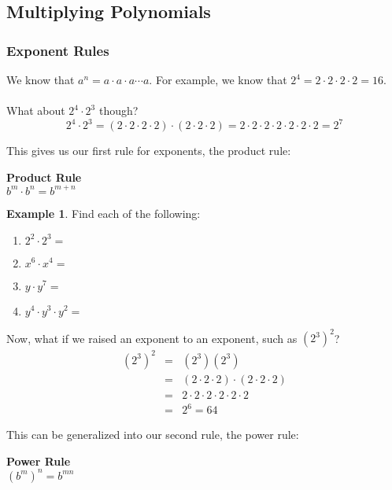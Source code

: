 \documentclass[addpoints,12pt]{exam}
\theoremstyle{definition}
\theoremstyle{break}
\theoremstyle{break}
\newtheorem{example}{Example}[subsection]
\begin{document}
\setcounter{section}{5}
\setcounter{subsection}{1}

\subsection{Multiplying Polynomials}

\vspace{.15in}

\subsubsection*{Exponent Rules}
\noindent We know that $a^n = a\cdot a \cdot a \cdots a$. For example, we know that $2^4 = 2\cdot 2\cdot 2\cdot 2 = 16$.
\\\\
What about $2^4\cdot 2^3$ though?
\[2^4\cdot 2^3 = (2\cdot 2\cdot 2\cdot 2)\cdot(2\cdot 2\cdot 2) = 2\cdot 2\cdot 2\cdot 2\cdot 2\cdot 2\cdot 2 = 2^7\]

\noindent This gives us our first rule for exponents, the product rule:
\begin{mdframed}
\textbf{Product Rule}\mbox{}\\
$b^m\cdot b^n = b^{m+n}$
\end{mdframed}

\begin{example}
Find each of the following:
\begin{enumerate}
\item $2^2\cdot 2^3 = $
\vspace{.25in}
\item $x^6\cdot x^4 = $
\vspace{.25in}
\item $y\cdot y^7 = $
\vspace{.25in}
\item $y^4\cdot y^3\cdot y^2 = $
\vspace{.25in}
\end{enumerate}
\end{example}

Now, what if we raised an exponent to an exponent, such as $(2^3)^2$?
\begin{eqnarray*}
(2^3)^2 &=& (2^3)(2^3)\\
&=& (2\cdot 2\cdot 2)\cdot(2\cdot 2\cdot 2)\\
&=& 2\cdot 2\cdot 2\cdot 2\cdot 2\cdot 2\\
&=& 2^6 = 64
\end{eqnarray*}

\noindent This can be generalized into our second rule, the power rule:
\begin{mdframed}
\textbf{Power Rule}\mbox{}\\
$(b^m)^n = b^{mn}$
\end{mdframed}
\end{document}
